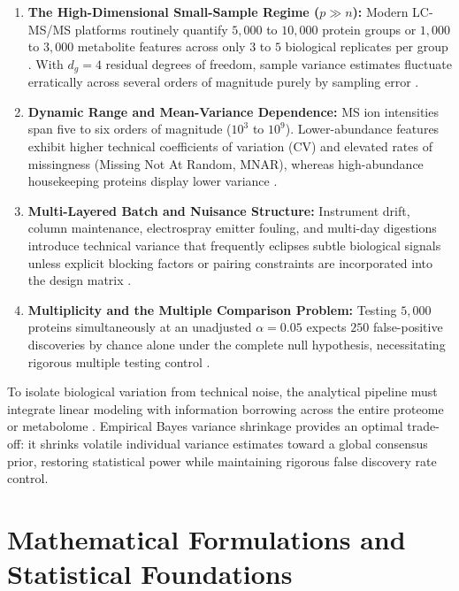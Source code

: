 \documentclass[11pt,twoside,openright]{book}
\begin{document}
\begin{enumerate}
    \item \textbf{The High-Dimensional Small-Sample Regime ($p \gg n$):} Modern LC-MS/MS platforms routinely quantify $5,000$ to $10,000$ protein groups or $1,000$ to $3,000$ metabolite features across only $3$ to $5$ biological replicates per group \cite{navarro2016multicenter}. With $d_g = 4$ residual degrees of freedom, sample variance estimates fluctuate erratically across several orders of magnitude purely by sampling error \cite{smyth2004linear, ritchie2015limma}.
    \item \textbf{Dynamic Range and Mean-Variance Dependence:} MS ion intensities span five to six orders of magnitude ($10^3$ to $10^9$). Lower-abundance features exhibit higher technical coefficients of variation (CV) and elevated rates of missingness (Missing Not At Random, MNAR), whereas high-abundance housekeeping proteins display lower variance \cite{karpievitch2012statistical, lazar2016accounting}.
    \item \textbf{Multi-Layered Batch and Nuisance Structure:} Instrument drift, column maintenance, electrospray emitter fouling, and multi-day digestions introduce technical variance that frequently eclipses subtle biological signals unless explicit blocking factors or pairing constraints are incorporated into the design matrix \cite{johnson2007adjusting, leek2010tackling}.
    \item \textbf{Multiplicity and the Multiple Comparison Problem:} Testing $5,000$ proteins simultaneously at an unadjusted $\alpha = 0.05$ expects $250$ false-positive discoveries by chance alone under the complete null hypothesis, necessitating rigorous multiple testing control \cite{benjamini1995controlling, storey2003statistical}.
\end{enumerate}

To isolate biological variation from technical noise, the analytical pipeline must integrate linear modeling with information borrowing across the entire proteome or metabolome \cite{boland2023health, gentleman2005bioinformatics}. Empirical Bayes variance shrinkage provides an optimal trade-off: it shrinks volatile individual variance estimates toward a global consensus prior, restoring statistical power while maintaining rigorous false discovery rate control.

\section{Mathematical Formulations and Statistical Foundations}
\end{document}
